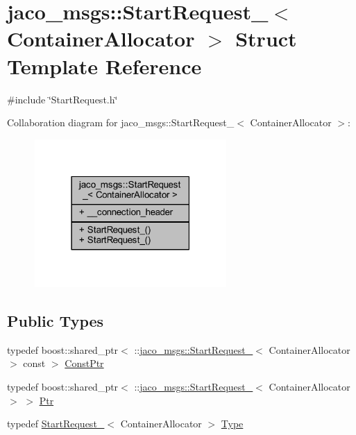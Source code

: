 \hypertarget{structjaco__msgs_1_1StartRequest__}{}\section{jaco\+\_\+msgs\+:\+:Start\+Request\+\_\+$<$ Container\+Allocator $>$ Struct Template Reference}
\label{structjaco__msgs_1_1StartRequest__}


{\ttfamily \#include \char`\"{}Start\+Request.\+h\char`\"{}}



Collaboration diagram for jaco\+\_\+msgs\+:\+:Start\+Request\+\_\+$<$ Container\+Allocator $>$\+:
\nopagebreak
\begin{figure}[H]
\begin{center}
\leavevmode
\includegraphics[width=207pt]{d7/dfe/structjaco__msgs_1_1StartRequest____coll__graph}
\end{center}
\end{figure}
\subsection*{Public Types}
\begin{DoxyCompactItemize}
\item 
typedef boost\+::shared\+\_\+ptr$<$ \+::\hyperlink{structjaco__msgs_1_1StartRequest__}{jaco\+\_\+msgs\+::\+Start\+Request\+\_\+}$<$ Container\+Allocator $>$ const  $>$ \hyperlink{structjaco__msgs_1_1StartRequest___a73ee55632438583c00552cfff7778a85}{Const\+Ptr}
\item 
typedef boost\+::shared\+\_\+ptr$<$ \+::\hyperlink{structjaco__msgs_1_1StartRequest__}{jaco\+\_\+msgs\+::\+Start\+Request\+\_\+}$<$ Container\+Allocator $>$ $>$ \hyperlink{structjaco__msgs_1_1StartRequest___a1ebdb2684053bdc4c0fd9684184d50e9}{Ptr}
\item 
typedef \hyperlink{structjaco__msgs_1_1StartRequest__}{Start\+Request\+\_\+}$<$ Container\+Allocator $>$ \hyperlink{structjaco__msgs_1_1StartRequest___ad232ca42d26ee4a9770730f6f2655422}{Type}
\end{DoxyCompactItemize}
